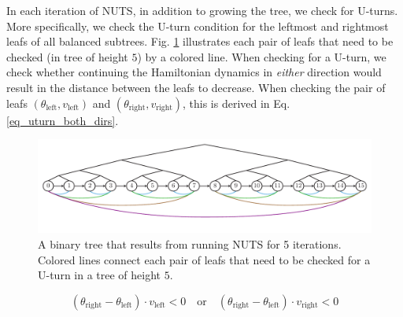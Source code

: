 \documentclass[12pt]{article}
\begin{document}
{In each iteration of NUTS, in addition to growing the tree, we check for U-turns. More specifically, we check the U-turn condition for the leftmost and rightmost leafs of all balanced subtrees. Fig. \ref{fig_nuts_uturn_leafs} illustrates each pair of leafs that need to be checked (in tree of height $5$) by a colored line. When checking for a U-turn, we check whether continuing the Hamiltonian dynamics in \textit{either} direction would result in the distance between the leafs to decrease. When checking the pair of leafs $(\theta_\text{left}, v_\text{left})$ and $(\theta_\text{right}, v_\text{right})$, this is derived in Eq. \ref{eq_uturn_both_dirs}.

\begin{figure}[H]
\centering
\includegraphics[width=16cm]{illustrations/nuts_uturn_leafs.pdf}
\caption{A binary tree that results from running NUTS for 5 iterations. Colored  lines connect each pair of leafs that need to be checked for a U-turn in a tree of height $5$.}
\label{fig_nuts_uturn_leafs}
\end{figure}

\begin{equation}
(\theta_\text{right} - \theta_\text{left}) \cdot v_\text{left} < 0
\quad \text{or} \quad
(\theta_\text{right} - \theta_\text{left}) \cdot v_\text{right} < 0
\label{eq_uturn_both_dirs}
\end{equation}

}
\end{document}
